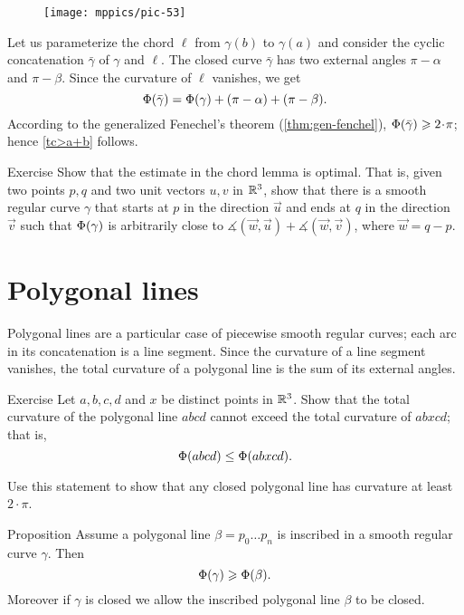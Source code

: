 \begin{wrapfigure}{o}{45 mm}
\vskip-0mm
\centering
\texttt{[image: mppics/pic-53]}
\vskip0mm
\end{wrapfigure}


Let us parameterize the chord $\ell$ from $\gamma(b)$ to $\gamma(a)$ and consider the cyclic concatenation $\bar\gamma$ of $\gamma$ and $\ell$.
The closed curve $\bar\gamma$ has two external angles $\pi-\alpha$ and $\pi-\beta$.
Since the curvature of $\ell$ vanishes, we get 
\[\Phi({\bar\gamma})=\Phi({\gamma})+(\pi-\alpha)+(\pi-\beta).\]
According to the generalized Fenechel's theorem (\ref{thm:gen-fenchel}),
$\tc{\bar\gamma}\ge 2\cdot\pi$;
hence \ref{tc>a+b} follows.
\qeds

\begin{thm}{Exercise}\label{ex:chord-lemma-optimal}
Show that the estimate in the chord lemma is optimal.
That is, given two points $p, q$ and two unit vectors $u,v$ in $\mathbb{R}^3$,
show that there is a smooth regular curve $\gamma$ that starts at $p$ in the direction $\vec u$ and ends at $q$ in the direction $\vec v$ such that 
$\Phi({\gamma})$ is arbitrarily close to $\measuredangle(\vec w,\vec u)+\measuredangle(\vec w,\vec v)$, where $\vec w=q-p$.

\end{thm}

\section*{Polygonal lines} 

Polygonal lines are a particular case of piecewise smooth regular curves;
each arc in its concatenation is a line segment.
Since the curvature of a line segment vanishes, the total curvature of a polygonal line is the sum of its external angles.

\begin{thm}{Exercise}\label{ex:monotonic-tc}
Let $a,b,c,d$ and $x$ be distinct points in $\mathbb{R}^3$.
Show that the total curvature of the polygonal line $abcd$ cannot exceed the total curvature of $abxcd$; that is, 
\[\Phi({abcd}) \leq \Phi({abxcd}).\]

Use this statement to show that any closed polygonal line has curvature at least $2\cdot\pi$.
\end{thm}



\begin{thm}{Proposition}\label{prop:inscribed-total-curvature}
Assume a polygonal line $\beta=p_0\dots p_n$ is inscribed in a smooth regular curve $\gamma$.
Then 
\[\Phi({\gamma})\geqslant \Phi({\beta}).\]
Moreover if $\gamma$ is closed we allow the inscribed polygonal line $\beta$ to be closed.

\end{thm}

